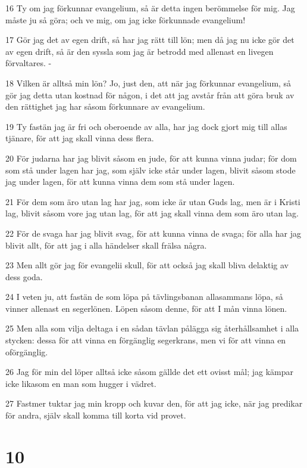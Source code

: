 \par 16 Ty om jag förkunnar evangelium, så är detta ingen berömmelse för mig. Jag måste ju så göra; och ve mig, om jag icke förkunnade evangelium!
\par 17 Gör jag det av egen drift, så har jag rätt till lön; men då jag nu icke gör det av egen drift, så är den syssla som jag är betrodd med allenast en livegen förvaltares. -
\par 18 Vilken är alltså min lön? Jo, just den, att när jag förkunnar evangelium, så gör jag detta utan kostnad för någon, i det att jag avstår från att göra bruk av den rättighet jag har såsom förkunnare av evangelium.
\par 19 Ty fastän jag är fri och oberoende av alla, har jag dock gjort mig till allas tjänare, för att jag skall vinna dess flera.
\par 20 För judarna har jag blivit såsom en jude, för att kunna vinna judar; för dom som stå under lagen har jag, som själv icke står under lagen, blivit såsom stode jag under lagen, för att kunna vinna dem som stå under lagen.
\par 21 För dem som äro utan lag har jag, som icke är utan Guds lag, men är i Kristi lag, blivit såsom vore jag utan lag, för att jag skall vinna dem som äro utan lag.
\par 22 För de svaga har jag blivit svag, för att kunna vinna de svaga; för alla har jag blivit allt, för att jag i alla händelser skall frälsa några.
\par 23 Men allt gör jag för evangelii skull, för att också jag skall bliva delaktig av dess goda.
\par 24 I veten ju, att fastän de som löpa på tävlingsbanan allasammans löpa, så vinner allenast en segerlönen. Löpen såsom denne, för att I mån vinna lönen.
\par 25 Men alla som vilja deltaga i en sådan tävlan pålägga sig återhållsamhet i alla stycken: dessa för att vinna en förgänglig segerkrans, men vi för att vinna en oförgänglig.
\par 26 Jag för min del löper alltså icke såsom gällde det ett ovisst mål; jag kämpar icke likasom en man som hugger i vädret.
\par 27 Fastmer tuktar jag min kropp och kuvar den, för att jag icke, när jag predikar för andra, själv skall komma till korta vid provet.

\chapter{10}

